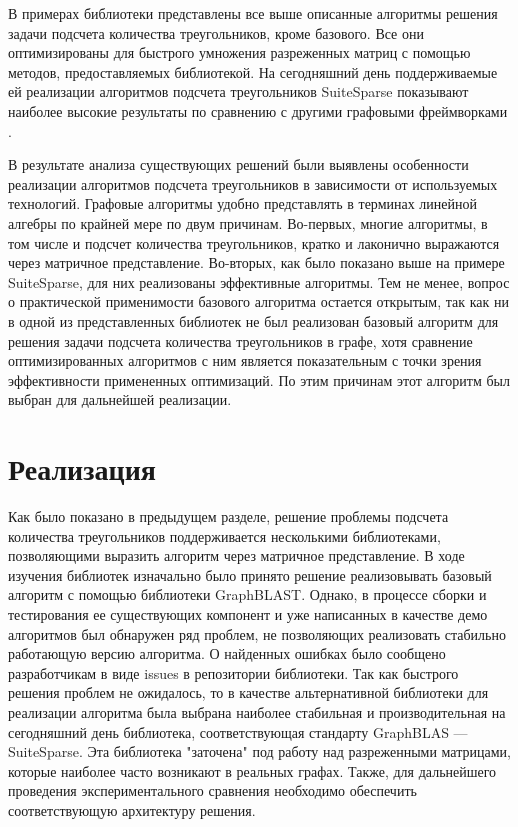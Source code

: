 \documentclass[14pt]{matmex-diploma}
\begin{document}
\begin{itemize}
В примерах библиотеки представлены все выше описанные алгоритмы решения задачи подсчета количества треугольников, кроме базового. Все они оптимизированы для быстрого умножения разреженных матриц с помощью методов, предоставляемых библиотекой. На сегодняшний день поддерживаемые ей реализации алгоритмов подсчета треугольников SuiteSparse показывают наиболее высокие результаты по сравнению с другими графовыми фреймворками \cite{suitesparse}.

\end{itemize}

В результате анализа существующих решений были выявлены особенности реализации алгоритмов подсчета треугольников в зависимости от используемых технологий. Графовые алгоритмы удобно представлять в терминах линейной алгебры по крайней мере по двум причинам. Во-первых, многие алгоритмы, в том числе и подсчет количества треугольников, кратко и лаконично выражаются через матричное представление. Во-вторых, как было показано выше на примере SuiteSparse, для них реализованы эффективные алгоритмы. Тем не менее, вопрос о практической применимости базового алгоритма остается открытым, так как ни в одной из представленных библиотек не был реализован базовый алгоритм для решения задачи подсчета количества треугольников в графе, хотя сравнение оптимизированных алгоритмов с ним является показательным с точки зрения эффективности примененных оптимизаций. По этим причинам этот алгоритм был выбран для дальнейшей реализации.

\section{Реализация}

Как было показано в предыдущем разделе, решение проблемы подсчета количества треугольников поддерживается несколькими библиотеками, позволяющими выразить алгоритм через матричное представление. В ходе изучения библиотек изначально было принято решение реализовывать базовый алгоритм с помощью библиотеки GraphBLAST. Однако, в процессе сборки и тестирования ее существующих компонент и уже написанных в качестве демо алгоритмов был обнаружен ряд проблем, не позволяющих реализовать стабильно работающую версию алгоритма. О найденных ошибках было сообщено разработчикам в виде issues в репозитории библиотеки. Так как быстрого решения проблем не ожидалось, то в качестве альтернативной библиотеки для реализации алгоритма была выбрана наиболее стабильная и производительная на сегодняшний день библиотека, соответствующая стандарту GraphBLAS --- SuiteSparse. Эта библиотека "заточена" под работу над разреженными матрицами, которые наиболее часто возникают в реальных графах. Также, для дальнейшего проведения экспериментального сравнения необходимо обеспечить соответствующую архитектуру решения. 
\end{document}
